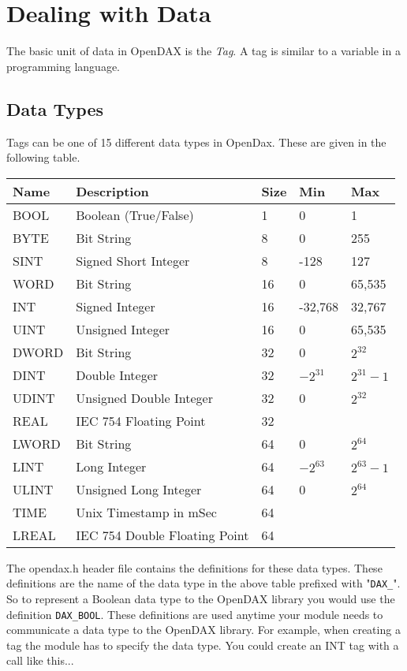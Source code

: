 \chapter{Dealing with Data}
The basic unit of data in OpenDAX is the \textit{Tag}.  A tag is similar to a variable in a programming language.
\section{Data Types}
Tags can be one of 15 different data types in OpenDax.  These are given in the following table.

\begin{tabular}{|l|l|l|l|l|}
\hline \textbf{Name} & \textbf{Description} & \textbf{Size} & \textbf{Min} & \textbf{Max} \\
\hline BOOL & Boolean (True/False) & 1 & 0 & 1 \\
\hline BYTE & Bit String & 8 & 0 & 255 \\
\hline SINT & Signed Short Integer & 8 & -128 & 127 \\
\hline WORD & Bit String & 16 & 0 & 65,535 \\
\hline INT & Signed Integer & 16 & -32,768 & 32,767 \\
\hline UINT & Unsigned Integer & 16 & 0 & 65,535 \\
\hline DWORD & Bit String & 32 & 0 & $2^{32}$ \\
\hline DINT & Double Integer & 32 & $-2^{31}$ & $2^{31}-1$ \\
\hline UDINT & Unsigned Double Integer & 32 & 0 & $2^{32}$ \\
\hline REAL & IEC 754 Floating Point & 32 &  &  \\
\hline LWORD & Bit String & 64 & 0 & $2^{64}$ \\
\hline LINT & Long Integer & 64 & $-2^{63}$ & $2^{63}-1$ \\
\hline ULINT & Unsigned Long Integer & 64 & 0 & $2^{64}$ \\
\hline TIME & Unix Timestamp in mSec & 64 &  &  \\
\hline LREAL & IEC 754 Double Floating Point & 64 &  &  \\
\hline 
\end{tabular}
 
The opendax.h header file contains the definitions for these data types.  These definitions are the name of the data type in the above table prefixed with "\texttt{DAX\_}".  So to represent a Boolean data type to the OpenDAX library you would use the definition \texttt{DAX\_BOOL}.  These definitions are used anytime your module needs to communicate a data type to the OpenDAX library.  For example, when creating a tag the module has to specify the data type.  You could create an INT tag with a call like this...

